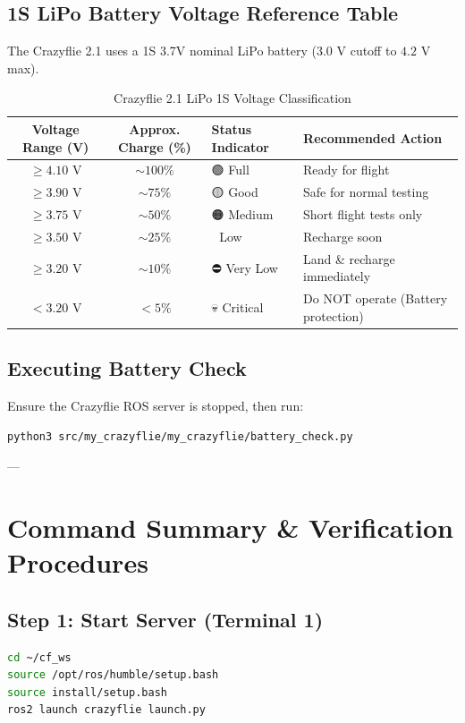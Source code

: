 \documentclass[11pt,a4paper]{article}
\begin{document}
\subsection{1S LiPo Battery Voltage Reference Table}
The Crazyflie 2.1 uses a 1S 3.7V nominal LiPo battery ($3.0\text{ V}$ cutoff to $4.2\text{ V}$ max).

\begin{table}[h!]
\centering
\caption{Crazyflie 2.1 LiPo 1S Voltage Classification}
\vspace{0.5em}
\begin{tabular}{@{}ccll@{}}
\toprule
\textbf{Voltage Range (V)} & \textbf{Approx. Charge (\%)} & \textbf{Status Indicator} & \textbf{Recommended Action} \\ \midrule
$\ge 4.10\text{ V}$ & $\sim 100\%$ & 🟢 Full & Ready for flight \\
$\ge 3.90\text{ V}$ & $\sim 75\%$ & 🟡 Good & Safe for normal testing \\
$\ge 3.75\text{ V}$ & $\sim 50\%$ & 🟠 Medium & Short flight tests only \\
$\ge 3.50\text{ V}$ & $\sim 25\%$ & 🔴 Low & Recharge soon \\
$\ge 3.20\text{ V}$ & $\sim 10\%$ & ⛔ Very Low & Land \& recharge immediately \\
$< 3.20\text{ V}$ & $< 5\%$ & 💀 Critical & Do NOT operate (Battery protection) \\ \bottomrule
\end{tabular}
\end{table}

\subsection{Executing Battery Check}
Ensure the Crazyflie ROS server is stopped, then run:
\begin{lstlisting}[language=bash]
python3 src/my_crazyflie/my_crazyflie/battery_check.py
\end{lstlisting}

---

\section{Command Summary \& Verification Procedures}

\subsection{Step 1: Start Server (Terminal 1)}
\begin{lstlisting}[language=bash]
cd ~/cf_ws
source /opt/ros/humble/setup.bash
source install/setup.bash
ros2 launch crazyflie launch.py
\end{lstlisting}
\end{document}
